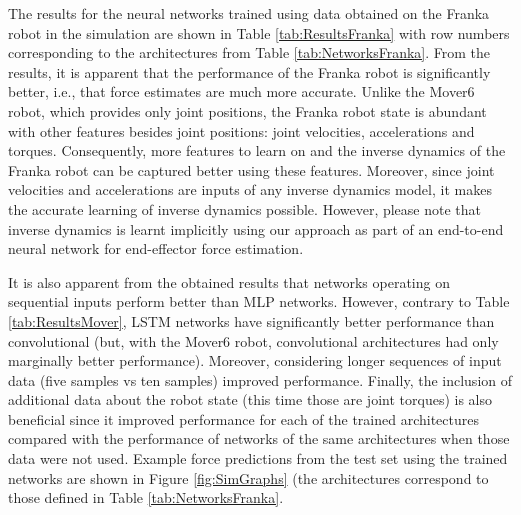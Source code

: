 The results for the neural networks trained using data obtained on the Franka robot in the simulation are shown in  Table \ref{tab:ResultsFranka} with row numbers corresponding to the architectures from Table \ref{tab:NetworksFranka}. From the results, it is apparent that the performance of the Franka robot is significantly better, i.e., that force estimates are much more accurate. Unlike the Mover6 robot, which provides only joint positions, the Franka robot state is abundant with other features besides joint positions: joint velocities, accelerations and torques. Consequently, more features to learn on and the inverse dynamics of the Franka robot can be captured better using these features. Moreover, since joint velocities and accelerations are inputs of any inverse dynamics model, it makes the accurate learning of inverse dynamics possible. However, please note that inverse dynamics is learnt implicitly using our approach as part of an end-to-end neural network for end-effector force estimation.

It is also apparent from the obtained results that networks operating on sequential inputs perform better than MLP networks. However, contrary to Table \ref{tab:ResultsMover}, LSTM networks have significantly better performance than convolutional (but, with the Mover6 robot, convolutional architectures had only marginally better performance). Moreover, considering longer sequences of input data (five samples vs ten samples) improved performance. Finally, the inclusion of additional data about the robot state (this time those are joint torques) is also beneficial since it improved performance for each of the trained architectures compared with the performance of networks of the same architectures when those data were not used. Example force predictions from the test set using the trained networks are shown in Figure \ref{fig:SimGraphs} (the architectures correspond to those defined in Table \ref{tab:NetworksFranka}.

